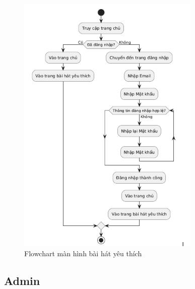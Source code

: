 \begin{figure}
    \centering
    \includegraphics[width=1\linewidth]{images/flowchart-yeu-thich.png}
    \caption{Flowchart màn hình bài hát yêu thích}
    \label{fig:flowchart-yeu-thich}
\end{figure}

\subsection{Admin}
\label{subsec:admin}

